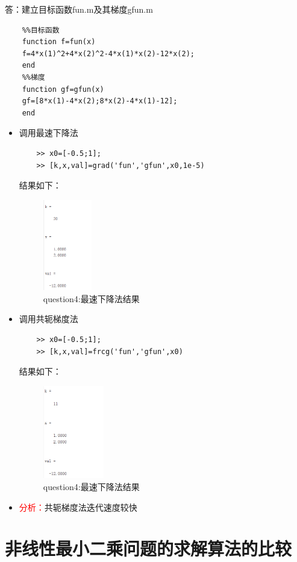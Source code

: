 \documentclass[12pt]{article} %
\begin{document}
	答：建立目标函数fun.m及其梯度gfun.m
	\begin{lstlisting}
	%%目标函数
	function f=fun(x)
	f=4*x(1)^2+4*x(2)^2-4*x(1)*x(2)-12*x(2);
	end
	%%梯度
	function gf=gfun(x)
	gf=[8*x(1)-4*x(2);8*x(2)-4*x(1)-12];
	end
	\end{lstlisting}
	\begin{itemize}
	\item 调用最速下降法
	\begin{lstlisting}
	>> x0=[-0.5;1];
	>> [k,x,val]=grad('fun','gfun',x0,1e-5)
	\end{lstlisting}
	
	结果如下：
	\begin{figure}[ht]
		\centering
		\includegraphics[width=0.2\textwidth]{zuisu.png}
		\caption{question4:最速下降法结果}
		\label{fig:fig1}
	\end{figure}
	\item 调用共轭梯度法
	\begin{lstlisting}
	>> x0=[-0.5;1];
	>> [k,x,val]=frcg('fun','gfun',x0)
	\end{lstlisting}
	
	结果如下：
	\begin{figure}[ht]
	\centering
	\includegraphics[width=0.25\textwidth]{gonge.png}
	\caption{question4:最速下降法结果}
	\label{fig:fig1}
	\end{figure}
	\item \textcolor{red}{分析：}共轭梯度法迭代速度较快
	\end{itemize}
	\section{非线性最小二乘问题的求解算法的比较}
\end{document}
